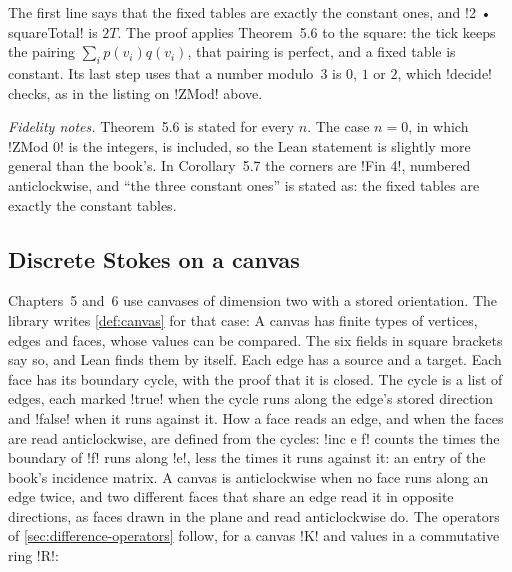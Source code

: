The first line says that the fixed tables are exactly the constant ones, and
\li!2 • squareTotal! is $2T$. The proof applies Theorem~5.6 to the square:
the tick keeps the pairing $\sum_ip(v_i)q(v_i)$, that pairing is perfect,
and a fixed table is constant. Its last step uses that a number modulo~$3$
is $0$, $1$ or $2$, which \li!decide! checks, as in the listing on \li!ZMod!
above.

\emph{Fidelity notes.} Theorem~5.6 is stated for every $n$. The case $n=0$,
in which \li!ZMod 0! is the integers, is included, so the Lean statement is
slightly more general than the book's. In Corollary~5.7 the corners are
\li!Fin 4!, numbered anticlockwise, and ``the three constant ones'' is
stated as: the fixed tables are exactly the constant tables.

\subsection*{Discrete Stokes on a canvas}

Chapters~5 and~6 use canvases of dimension two with a stored orientation.
The library writes \cref{def:canvas} for that case:
A canvas has finite types of vertices, edges and faces, whose values can be
compared. The six fields in square brackets say so, and Lean finds them by
itself. Each edge has a source and a target. Each face has its boundary
cycle, with the proof that it is closed. The cycle is a list of edges, each
marked \li!true! when the cycle runs along the edge's stored direction and
\li!false! when it runs against it. How a face reads an edge, and when the
faces are read anticlockwise, are defined from the cycles:
\li!inc e f! counts the times the boundary of \li!f! runs along \li!e!, less
the times it runs against it: an entry of the book's incidence matrix. A
canvas is anticlockwise when no face runs along an edge twice, and two
different faces that share an edge read it in opposite directions, as faces
drawn in the plane and read anticlockwise do. The operators of
\cref{sec:difference-operators} follow, for a canvas \li!K! and values in a
commutative ring \li!R!:


